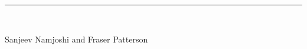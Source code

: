 \begin{titlepage}
\begin{flushleft}

\textbf{\selectfont\Huge \BigTitle}

\par\noindent\rule{\textwidth}{4pt}\\


\begin{flushright}
\Large Sanjeev Namjoshi and Fraser Patterson
\end{flushright}

\vspace{\fill}

\end{flushleft}
\end{titlepage}

\restoregeometry